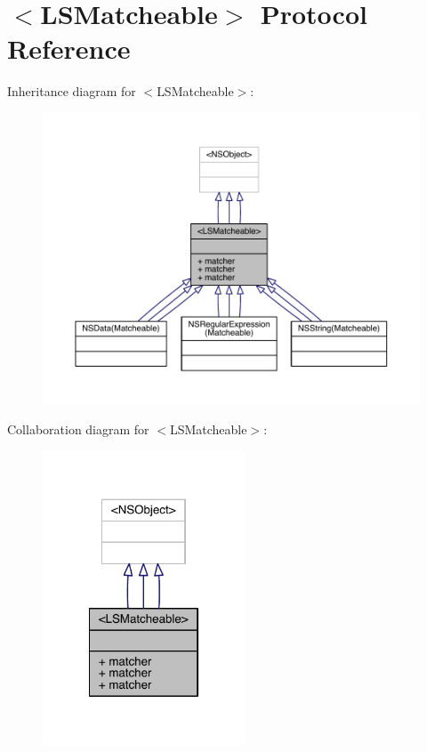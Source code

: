\hypertarget{protocol_l_s_matcheable-p}{\section{$<$L\-S\-Matcheable$>$ Protocol Reference}
\label{protocol_l_s_matcheable-p}
}


Inheritance diagram for $<$L\-S\-Matcheable$>$\-:\nopagebreak
\begin{figure}[H]
\begin{center}
\leavevmode
\includegraphics[width=350pt]{protocol_l_s_matcheable-p__inherit__graph}
\end{center}
\end{figure}


Collaboration diagram for $<$L\-S\-Matcheable$>$\-:\nopagebreak
\begin{figure}[H]
\begin{center}
\leavevmode
\includegraphics[width=170pt]{protocol_l_s_matcheable-p__coll__graph}
\end{center}
\end{figure}
